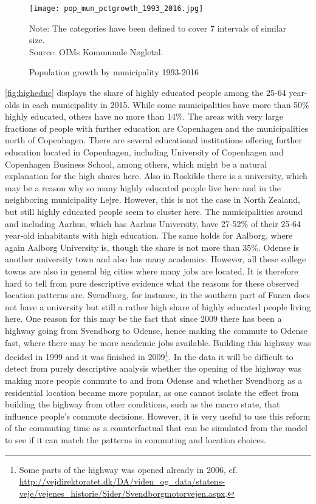 \begin{figure}
\centering
\begin{minipage}{0.55\textwidth}
\texttt{[image: pop\_mun\_pctgrowth\_1993\_2016.jpg]} 
{\tiny Note: The categories have been defined to cover 7 intervals of similar size. \\ Source: OIMs Kommunale Nøgletal. \par}
\end{minipage}
\caption{Population growth by municipality 1993-2016}
\label{fig:poppct}
\end{figure}

\autoref{fig:higheduc} displays the share of highly educated people among the 25-64 year-olds in each municipality in 2015. While some municipalities have more than 50\% highly educated, others have no more than 14\%. The areas with very large fractions of people with further education are Copenhagen and the municipalities north of Copenhagen. There are several educational institutions offering further education located in Copenhagen, including University of Copenhagen and Copenhagen Business School, among others, which might be a natural explanation for the high shares here. Also in Roskilde there is a university, which may be a reason why so many highly educated people live here and in the neighboring municipality Lejre. However, this is not the case in North Zealand, but still highly educated people seem to cluster here. The municipalities around and including Aarhus, which has Aarhus University, have 27-52\% of their 25-64 year-old inhabitants with high education. The same holds for Aalborg, where again Aalborg University is, though the share is not more than 35\%. Odense is another university town and also has many academics. However, all these college towns are also in general big cities where many jobs are located. It is therefore hard to tell from pure descriptive evidence what the reasons for these observed location patterns are. Svendborg, for instance, in the southern part of Funen does not have a university but still a rather high share of highly educated people living here. One reason for this may be the fact that since 2009 there has been a highway going from Svendborg to Odense, hence making the commute to Odense fast, where there may be more academic jobs available. Building this highway was decided in 1999 and it was finished in 2009\footnote{Some parts of the highway was opened already in 2006, cf. \url{http://vejdirektoratet.dk/DA/viden_og_data/statens-veje/vejenes_historie/Sider/Svendborgmotorvejen.aspx}.}. In the data it will be difficult to detect from purely descriptive analysis whether the opening of the highway was making more people commute to and from Odense and whether Svendborg as a residential location became more popular, as one cannot isolate the effect from building the highway from other conditions, such as the macro state, that influence people's commute decisions. However, it is very useful to use this reform of the commuting time as a counterfactual that can be simulated from the model to see if it can match the patterns in commuting and location choices.
